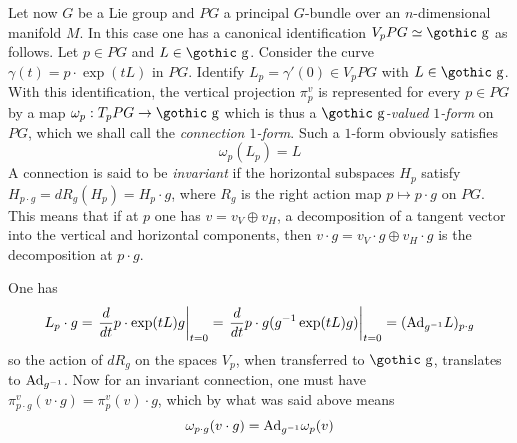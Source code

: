 \documentclass[12pt,titlepage]{article}
\def\goth#1{\hbox{\gothic #1}}
\def\gg{{\goth g}}
\def\Ad{\hbox{Ad}}
\begin{document}
Let now \(G\) be a Lie group and  \(PG\)  a principal \(G\)-bundle over an
\(n\)-dimensional
manifold \(M\). In this case  one has a canonical
identification \(V_pPG \simeq \gg\) as follows.   Let \(p\in PG\) and
\(L\in \gg\). Consider the curve \(\gamma(t) = p\cdot \exp(tL)\) in
\(PG\). Identify \(L_p=\gamma'(0)\in V_pPG\) with \(L\in \gg\).
With this identification, the vertical projection \(\pi^v_p\) 
is represented for every \(p\in PG\) by a map
\(\omega_p:T_pPG \to \gg\) which is thus a {\em
\(\gg\)-valued \(1\)-form\/}
\index{\(1\)-form!\(\gg\)-valued}%
 on \(PG\), which we shall call the {\em
connection \(1\)-form\/}.
%
Such a \(1\)-form obviously satisfies
\begin{equation} \label{eq:proj}
\omega_p(L_p) = L
\end{equation}%
A connection is said to be {\em invariant\/}
%
 if the
horizontal subspaces \(H_p\) satisfy
\(H_{p\cdot g} =
dR_g(H_p)=H_p\cdot g\), where \(R_g \) is the right action
map \(p\mapsto p\cdot g\) on \(PG\).
This means that if at \(p\) one has \(v=v_V\oplus
v_H\),
a decomposition of a tangent vector into the vertical and horizontal
components, then \(v\cdot g=v_V\cdot g \oplus v_H\cdot g\)
is the decomposition at \(p\cdot g\).

One has
\[
 L_p\cdot g = \left.\frac{d}{dt}p\cdot\exp(tL)g\right|_{t=0} =
\left.\frac{d}{dt}p\cdot g(g^{-1}\exp(tL)g)\right|_{t=0}  =
(\Ad_{g^{-1}}L)_{p\cdot g}
\]
 so the action of \(dR_g\) on the spaces
\(V_p\), when transferred to \(\gg\), translates to \(\Ad_{g^{-1}}\).
Now for an invariant connection, one
must have \(\pi^v_{p\cdot g}(v\cdot g) = \pi^v_p(v)\cdot g\), which by what
was said
above means
\begin{equation} \label{eq:ad}
\omega_{p\cdot g}(v\cdot g) =\Ad_{g^{-1}}\omega_p(v)
\end{equation}%
\end{document}
